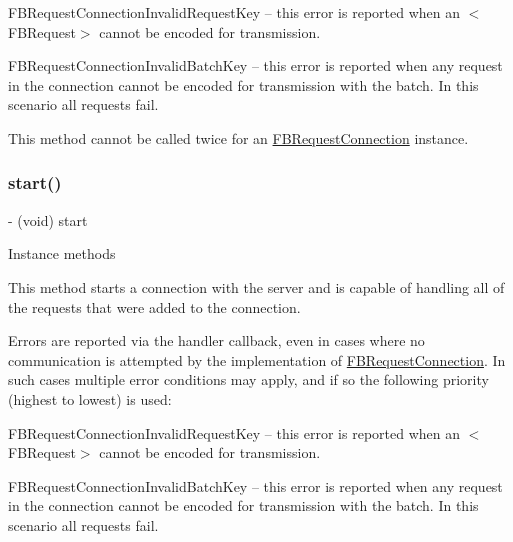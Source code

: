 \begin{DoxyItemize}
\item {\ttfamily F\+B\+Request\+Connection\+Invalid\+Request\+Key} -- this error is reported when an $<$\+F\+B\+Request$>$ cannot be encoded for transmission.
\item {\ttfamily F\+B\+Request\+Connection\+Invalid\+Batch\+Key} -- this error is reported when any request in the connection cannot be encoded for transmission with the batch. In this scenario all requests fail.
\end{DoxyItemize}

This method cannot be called twice for an {\ttfamily \hyperlink{interfaceFBRequestConnection}{F\+B\+Request\+Connection}} instance. \mbox{\label{interfaceFBRequestConnection_a8ddb3ae0c9915b148492678fdbc66a6c}} 
\subsubsection{\texorpdfstring{start()}{start()}\hspace{0.1cm}{\footnotesize\ttfamily [5/5]}}
{\footnotesize\ttfamily -\/ (void) start \begin{DoxyParamCaption}{ }\end{DoxyParamCaption}}

Instance methods

This method starts a connection with the server and is capable of handling all of the requests that were added to the connection.

Errors are reported via the handler callback, even in cases where no communication is attempted by the implementation of {\ttfamily \hyperlink{interfaceFBRequestConnection}{F\+B\+Request\+Connection}}. In such cases multiple error conditions may apply, and if so the following priority (highest to lowest) is used\+:


\begin{DoxyItemize}
\item {\ttfamily F\+B\+Request\+Connection\+Invalid\+Request\+Key} -- this error is reported when an $<$\+F\+B\+Request$>$ cannot be encoded for transmission.
\item {\ttfamily F\+B\+Request\+Connection\+Invalid\+Batch\+Key} -- this error is reported when any request in the connection cannot be encoded for transmission with the batch. In this scenario all requests fail.
\end{DoxyItemize}

